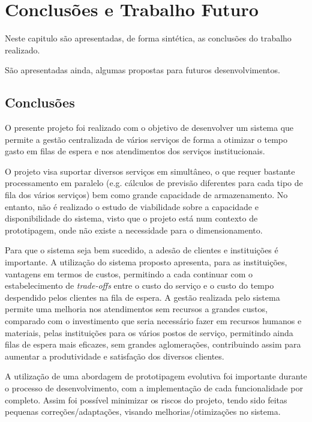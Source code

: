 
\chapter{Conclusões e Trabalho Futuro}
\label{cha:conclusoesetrabalhofinal}

Neste capitulo são apresentadas, de forma sintética, as conclusões do trabalho realizado.  

São apresentadas ainda, algumas propostas para futuros desenvolvimentos.

\section{Conclusões}

O presente projeto foi realizado com o objetivo de desenvolver um sistema que permite a gestão centralizada de vários serviços de forma a otimizar o tempo gasto em filas de espera e nos atendimentos dos serviços institucionais. 

O projeto visa suportar diversos serviços em simultâneo, o que requer bastante processamento em paralelo (e.g. cálculos de previsão diferentes para cada tipo de fila dos vários serviços) bem como grande capacidade de armazenamento. No entanto, não é realizado o estudo de viabilidade sobre a capacidade e disponibilidade do sistema, visto que o projeto está num contexto de prototipagem, onde não existe a necessidade para o dimensionamento.

Para que o sistema seja bem sucedido, a adesão de clientes e instituições é importante. 
A utilização do sistema proposto apresenta, para as instituições, vantagens em termos de custos, permitindo a cada continuar com o estabelecimento de \textit{trade-offs} entre o custo do serviço e o custo do tempo despendido pelos clientes na fila de espera. A gestão realizada pelo sistema permite uma melhoria nos atendimentos sem recursos a grandes custos, comparado com o investimento que seria necessário fazer em recursos humanos e materiais, pelas instituições para os vários postos de serviço, permitindo ainda filas de espera mais eficazes, sem grandes aglomerações, contribuindo assim para aumentar a produtividade e satisfação dos diversos clientes.

A utilização de uma abordagem de prototipagem evolutiva foi importante durante o processo de desenvolvimento, com a implementação de cada funcionalidade por completo. Assim foi possível minimizar os riscos do projeto, tendo sido feitas pequenas correções/adaptações, visando melhorias/otimizações no sistema.

